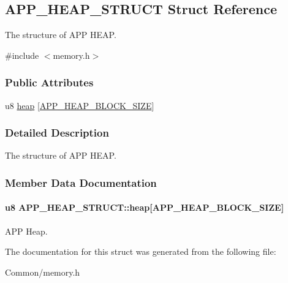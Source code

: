 \hypertarget{struct_a_p_p___h_e_a_p___s_t_r_u_c_t}{}\subsection{A\+P\+P\+\_\+\+H\+E\+A\+P\+\_\+\+S\+T\+R\+U\+CT Struct Reference}
\label{struct_a_p_p___h_e_a_p___s_t_r_u_c_t}


The structure of A\+PP H\+E\+AP.  




{\ttfamily \#include $<$memory.\+h$>$}

\subsubsection*{Public Attributes}
\begin{DoxyCompactItemize}
\item 
u8 \hyperlink{struct_a_p_p___h_e_a_p___s_t_r_u_c_t_a134adbac3f5f7c98202bc675054964de}{heap} \mbox{[}\hyperlink{group___h_e_a_p_gab940ae4a9a888cb4b29cdac91e969100}{A\+P\+P\+\_\+\+H\+E\+A\+P\+\_\+\+B\+L\+O\+C\+K\+\_\+\+S\+I\+ZE}\mbox{]}
\end{DoxyCompactItemize}


\subsubsection{Detailed Description}
The structure of A\+PP H\+E\+AP. 

\subsubsection{Member Data Documentation}
\paragraph[{\texorpdfstring{heap}{heap}}]{\setlength{\rightskip}{0pt plus 5cm}u8 A\+P\+P\+\_\+\+H\+E\+A\+P\+\_\+\+S\+T\+R\+U\+C\+T\+::heap\mbox{[}{\bf A\+P\+P\+\_\+\+H\+E\+A\+P\+\_\+\+B\+L\+O\+C\+K\+\_\+\+S\+I\+ZE}\mbox{]}}\hypertarget{struct_a_p_p___h_e_a_p___s_t_r_u_c_t_a134adbac3f5f7c98202bc675054964de}{}\label{struct_a_p_p___h_e_a_p___s_t_r_u_c_t_a134adbac3f5f7c98202bc675054964de}
A\+PP Heap. 

The documentation for this struct was generated from the following file\+:\begin{DoxyCompactItemize}
\item 
Common/memory.\+h\end{DoxyCompactItemize}

